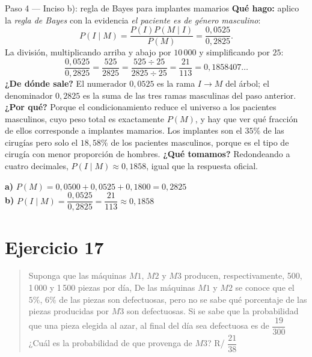 \documentclass[11pt]{article}
\begin{document}
\begin{sol}
\begin{paso}{Paso 4 --- Inciso b): regla de Bayes para implantes mamarios}
\textbf{Qué hago:} aplico la \emph{regla de Bayes} con la evidencia \emph{el paciente es de género masculino}:
\[
P(I\mid M)=\frac{P(I)P(M\mid I)}{P(M)}=\frac{0,0525}{0,2825}.
\]
La división, multiplicando arriba y abajo por $10\,000$ y simplificando por $25$:
\[
\frac{0,0525}{0,2825}=\frac{525}{2825}=\frac{525\div 25}{2825\div 25}=\frac{21}{113}=0,1858407\ldots
\]
\textbf{¿De dónde sale?} El numerador $0,0525$ es la rama $I\to M$ del árbol; el denominador $0,2825$ es la suma de las tres ramas masculinas del paso anterior.
\textbf{¿Por qué?} Porque el condicionamiento reduce el universo a los pacientes masculinos, cuyo peso total es exactamente $P(M)$, y hay que ver qué fracción de ellos corresponde a implantes mamarios. Los implantes son el $35\%$ de las cirugías pero solo el $18,58\%$ de los pacientes masculinos, porque es el tipo de cirugía con menor proporción de hombres.
\textbf{¿Qué tomamos?} Redondeando a cuatro decimales, $P(I\mid M)\approx 0,1858$, igual que la respuesta oficial.
\end{paso}

\begin{resp}
\textbf{a)} $P(M)=0,0500+0,0525+0,1800=0,2825$\\
\textbf{b)} $P(I\mid M)=\dfrac{0,0525}{0,2825}=\dfrac{21}{113}\approx 0,1858$
\end{resp}

\end{sol}

\newpage
\section*{Ejercicio 17}

\begin{quote}
Suponga que las máquinas $M1$, $M2$ y $M3$ producen, respectivamente, 500, 1\,000 y 1\,500 piezas por día, De las máquinas $M1$ y $M2$ se conoce que el $5\%$, $6\%$ de las piezas son defectuosas, pero no se sabe qué porcentaje de las piezas producidas por $M3$ son defectuosas. Si se sabe que la probabilidad que una pieza elegida al azar, al final del día sea defectuosa es de $\dfrac{19}{300}$ ¿Cuál es la probabilidad de que provenga de $M3$? \hfill R/ $\dfrac{21}{38}$
\end{quote}
\end{document}
